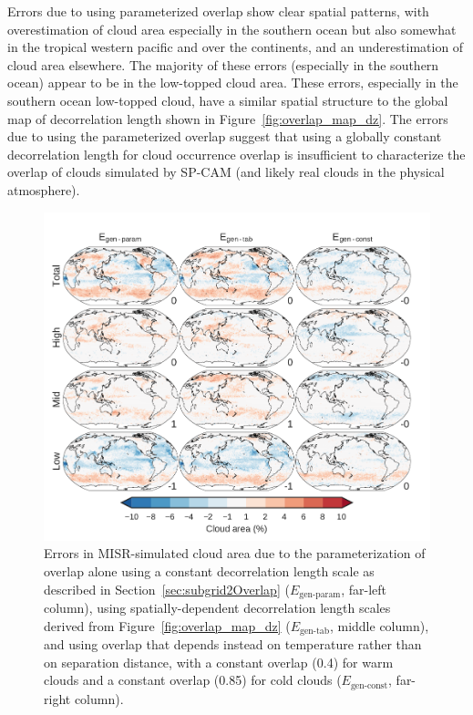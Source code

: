 Errors due to using parameterized overlap show clear spatial patterns,
with overestimation of cloud area especially in the southern ocean but
also somewhat in the tropical western pacific and over the continents,
and an underestimation of cloud area elsewhere. The majority of these
errors (especially in the southern ocean) appear to be in the low-topped
cloud area. These errors, especially in the southern ocean low-topped
cloud, have a similar spatial structure to the global map of
decorrelation length shown in Figure~\ref{fig:overlap_map_dz}. The
errors due to using the parameterized overlap suggest that using a
globally constant decorrelation length for cloud occurrence overlap is
insufficient to characterize the overlap of clouds simulated by SP-CAM
(and likely real clouds in the physical atmosphere).

\begin{figure}[htbp]
\centering
\includegraphics{graphics/subgrid2_cldmisr_maps_overlap_diff.pdf}
\caption{\label{fig:cldmisrMapsOverlapDiff}Errors in MISR-simulated
cloud area due to the parameterization of overlap alone using a constant
decorrelation length scale as described in
Section~\ref{sec:subgrid2Overlap} (\(E_\textrm{gen-param}\), far-left
column), using spatially-dependent decorrelation length scales derived
from Figure~\ref{fig:overlap_map_dz} (\(E_\textrm{gen-tab}\), middle
column), and using overlap that depends instead on temperature rather
than on separation distance, with a constant overlap (0.4) for warm
clouds and a constant overlap (0.85) for cold clouds
(\(E_\textrm{gen-const}\), far-right
column).}\label{fig:cldmisrMapsOverlapDiff}
\end{figure}

